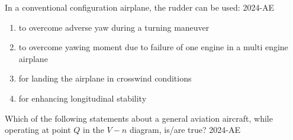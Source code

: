 \iffalse
\chapter{2024}
\author{ee24btech11056}
\section{ae}
\fi
    \item In a conventional configuration airplane, the rudder can be used:
    \hfill{2024-AE}
    \begin{enumerate}
        \item to overcome adverse yaw during a turning maneuver
        \item to overcome yawing moment due to failure of one engine in a multi engine airplane
        \item for landing the airplane in crosswind conditions
        \item for enhancing longitudinal stability
    \end{enumerate}

    \item Which of the following statements about a general aviation aircraft, while operating at point $Q$ in the $V-n$ diagram, is/are true?
 \hfill{2024-AE}



